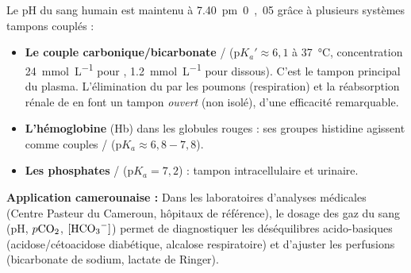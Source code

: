 \documentclass[11pt]{article}
\begin{document}
\begin{savaistu}
Le pH du sang humain est maintenu à \SI{7,40}{\pm 0,05} grâce à plusieurs systèmes tampons couplés :
\begin{itemize}
\item \textbf{Le couple carbonique/bicarbonate} / ($\text{p}K_a' \approx 6,1$ à \SI{37}{\celsius}, concentration \SI{24}{mmol.L^{-1}} pour , \SI{1,2}{mmol.L^{-1}} pour  dissous). C'est le tampon principal du plasma. L'élimination du  par les poumons (respiration) et la réabsorption rénale de  en font un tampon \emph{ouvert} (non isolé), d'une efficacité remarquable.
\item \textbf{L'hémoglobine} (Hb) dans les globules rouges : ses groupes histidine agissent comme couples / ($\text{p}K_a \approx 6,8-7,8$).
\item \textbf{Les phosphates} / ($\text{p}K_a = 7,2$) : tampon intracellulaire et urinaire.
\end{itemize}
\textbf{Application camerounaise :} Dans les laboratoires d'analyses médicales (Centre Pasteur du Cameroun, hôpitaux de référence), le dosage des gaz du sang (pH, $p\ce{CO2}$, $[\ce{HCO3-}]$) permet de diagnostiquer les déséquilibres acido-basiques (acidose/cétoacidose diabétique, alcalose respiratoire) et d'ajuster les perfusions (bicarbonate de sodium, lactate de Ringer).
\end{savaistu}
\end{document}
